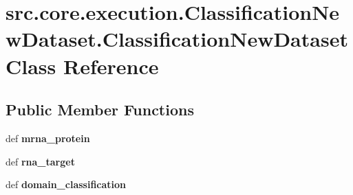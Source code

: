 \hypertarget{classsrc_1_1core_1_1execution_1_1ClassificationNewDataset_1_1ClassificationNewDataset}{\section{src.\-core.\-execution.\-Classification\-New\-Dataset.\-Classification\-New\-Dataset Class Reference}
\label{classsrc_1_1core_1_1execution_1_1ClassificationNewDataset_1_1ClassificationNewDataset}
}
\subsection*{Public Member Functions}
\begin{DoxyCompactItemize}
\item 
\hypertarget{classsrc_1_1core_1_1execution_1_1ClassificationNewDataset_1_1ClassificationNewDataset_a267b17ae3c80b399df841739fab8c1b2}{def {\bfseries mrna\-\_\-protein}}\label{classsrc_1_1core_1_1execution_1_1ClassificationNewDataset_1_1ClassificationNewDataset_a267b17ae3c80b399df841739fab8c1b2}

\item 
\hypertarget{classsrc_1_1core_1_1execution_1_1ClassificationNewDataset_1_1ClassificationNewDataset_acfb4f1d0ecae5a6c030329f6d0a1439d}{def {\bfseries rna\-\_\-target}}\label{classsrc_1_1core_1_1execution_1_1ClassificationNewDataset_1_1ClassificationNewDataset_acfb4f1d0ecae5a6c030329f6d0a1439d}

\item 
\hypertarget{classsrc_1_1core_1_1execution_1_1ClassificationNewDataset_1_1ClassificationNewDataset_a4d2c081c35737aba6b7dec2bdba37375}{def {\bfseries domain\-\_\-classification}}\label{classsrc_1_1core_1_1execution_1_1ClassificationNewDataset_1_1ClassificationNewDataset_a4d2c081c35737aba6b7dec2bdba37375}

\end{DoxyCompactItemize}
